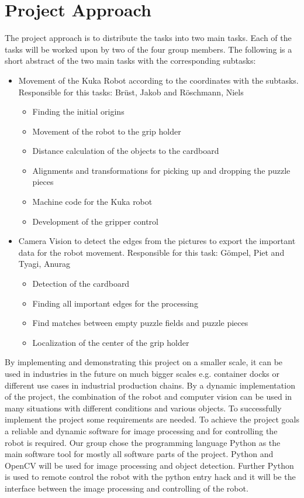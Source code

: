 \documentclass[a4paper, 12pt]{scrartcl}%
\begin{document}
	\section{Project Approach}
	The project approach is to distribute the tasks into two main tasks. Each of the tasks will be worked upon by two of the four group members. The following is a short abstract of the two main tasks with the corresponding subtasks:\newline
	\begin{itemize}
		\item Movement of the Kuka Robot according to the coordinates with the subtasks. Responsible for this tasks: Brüst, Jakob and Röschmann, Niels
		\begin{itemize}
			\item Finding the initial origins
			\item Movement of the robot to the grip holder
			\item Distance calculation of the objects to the cardboard
			\item Alignments and transformations for picking up and dropping the puzzle pieces 
			\item Machine code for the Kuka robot
			\item Development of the gripper control 		
		\end{itemize}
		\item Camera Vision to detect the edges from the pictures to export the important data for the robot movement. Responsible for this task: Gömpel, Piet and Tyagi, Anurag
		\begin{itemize}
			\item Detection of the cardboard
			\item Finding all important edges for the processing
			\item Find matches between empty puzzle fields and puzzle pieces
			\item Localization of the center of the grip holder		
		\end{itemize}
	\end{itemize}
	By implementing and demonstrating this project on a smaller scale, it can be used in industries in the future on much bigger scales e.g. container docks or different use cases in industrial production chains. By a dynamic implementation of the project, the combination of the robot and computer vision can be used in many situations with different conditions and various objects.\newline
	To successfully implement the project some requirements are needed. To achieve the project goals a reliable and dynamic software for image processing and for controlling the robot is required. Our group chose the programming language Python as the main software tool for mostly all software parts of the project. Python and OpenCV will be used for image processing and object detection. Further Python is used to remote control the robot with the python entry hack and it will be the interface between the image processing and controlling of the robot.\newline
	
\end{document}
